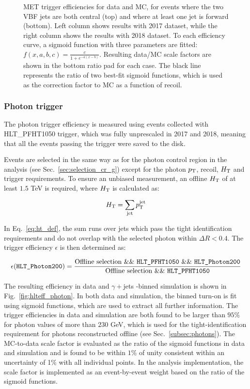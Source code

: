 \begin{figure}[ht!]
    \caption{MET trigger efficiencies for data and MC, for events where the two VBF jets are both central (top) 
    and where at least one jet is forward (bottom). Left column shows results with 2017 dataset, while the right column shows
    the results with 2018 dataset. To each efficiency curve, a sigmoid function 
    with three parameters are fitted: $f(x,a,b,c) = \frac{c}{1+e^{-a(x-b)}}$. 
    Resulting data/MC scale factors are shown in the bottom ratio pad for each case. The black line represents
    the ratio of two best-fit sigmoid functions, which is used as the correction factor to MC as a function of recoil.}
    \label{fig:sigmoid_fits_eff}
\end{figure}

\clearpage

\subsubsection{Photon trigger}
\label{subsubsec:photon_trig}

The photon trigger efficiency is measured using events collected with HLT\_PFHT1050
trigger, which was fully unprescaled in 2017 and 2018, meaning that all the events passing the trigger were saved to the
disk.

Events are selected in the same way as for the photon control region in the analysis
(see Sec.~\ref{sec:selection_cr_g}) except for the photon $p_{\textrm{T}}$, recoil, $H_\mathrm{T}$ and trigger requirements. To ensure an unbiased measurement, 
an offline $H_\mathrm{T}$ of at least $1.5$ TeV is required, where $H_\mathrm{T}$ is calculated as: 

\begin{equation}
  H_\mathrm{T} = \sum_{\textrm{jet}} p_{\textrm{T}}^{\textrm{jet}}
  \label{eq:ht_def}
\end{equation}

In Eq.~\ref{eq:ht_def}, the sum runs over jets which pass the tight identification requirements 
and do not overlap with the selected photon within $\Delta R<0.4$. 
The trigger efficiency $\epsilon$ is then determined as:

$$\epsilon(\texttt{HLT\_Photon200}) = \frac{\text{Offline selection \&\& \texttt{HLT\_PFHT1050} \&\& 
\texttt{HLT\_Photon200}}}{\text{Offline selection \&\& \texttt{HLT\_PFHT1050}}} $$

The resulting efficiency in data and $\gamma +$jets \HT-binned simulation is shown in Fig.~\ref{fig:hlteff_photon}. In both data and simulation, 
the binned turn-on is fit using sigmoid functions, which are used to extract all further information. The trigger efficiencies in data and simulation are both 
found to be larger than $95\%$ for photon \pt values of more than $230$ GeV, which is used for the tight-identification requirement for photons reconstructed offline
(see Sec.~\ref{subsec:photons}). The MC-to-data scale factor is 
evaluated as the ratio of the sigmoid functions in data and simulation and is found to be within $1\%$ of unity consistent within an uncertainty of 1\% 
with all individual points. In the analysis implementation, the scale factor is implemented as an event-by-event weight based on the ratio of the sigmoid functions.

